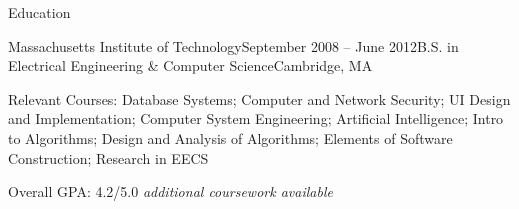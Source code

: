 \documentclass{resume} %
\begin{document}
\begin{rSection}{Education}

\begin{rSubsection}{Massachusetts Institute of Technology}{September 2008 -- June 2012}{B.S. in Electrical Engineering \& Computer Science}{Cambridge, MA}
\item Relevant Courses: Database Systems; Computer and Network Security; UI Design and Implementation; Computer System Engineering; Artificial Intelligence; Intro to Algorithms; Design and Analysis of Algorithms; Elements of Software Construction; Research in EECS
\item Overall GPA: 4.2/5.0 \hfill \em{additional coursework available}


\end{rSubsection}

\end{rSection}

\end{document}
